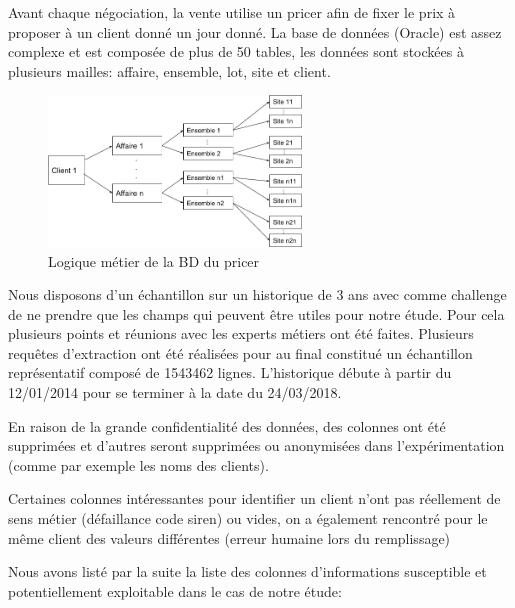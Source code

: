 \documentclass[12pt]{article}
\begin{document}
{Avant chaque négociation, la vente utilise un pricer afin de fixer le prix à proposer à un client donné un jour donné.
La base de données (Oracle) est assez complexe et est composée de plus de 50 tables, les données sont stockées à plusieurs mailles: affaire, ensemble, lot, site et client.


\begin{figure}[H]
	\centering
    \includegraphics[width=0.6\textwidth]{image23.png}
     \caption{ Logique métier de la BD du pricer }
    \label{fig:23}
\end{figure}


Nous disposons d’un échantillon sur un historique de 3 ans avec comme challenge de ne prendre que les champs qui peuvent être utiles pour notre étude. 
Pour cela plusieurs points et réunions avec les experts métiers ont été faites. Plusieurs requêtes d’extraction ont été réalisées pour au final constitué un échantillon représentatif composé de 1543462 lignes. L’historique débute à partir du 12/01/2014 pour se terminer à la date du 24/03/2018.

En raison de la grande confidentialité des données, des colonnes ont été supprimées et d'autres seront supprimées ou anonymisées dans l'expérimentation (comme par exemple les noms des clients). 

Certaines colonnes intéressantes pour identifier un client n’ont pas réellement de sens métier (défaillance code siren) ou vides, on a également rencontré pour le même client des valeurs différentes (erreur humaine lors du remplissage) 

Nous avons listé par la suite la liste des colonnes d’informations susceptible et potentiellement exploitable dans le cas de notre étude:

}
\end{document}
